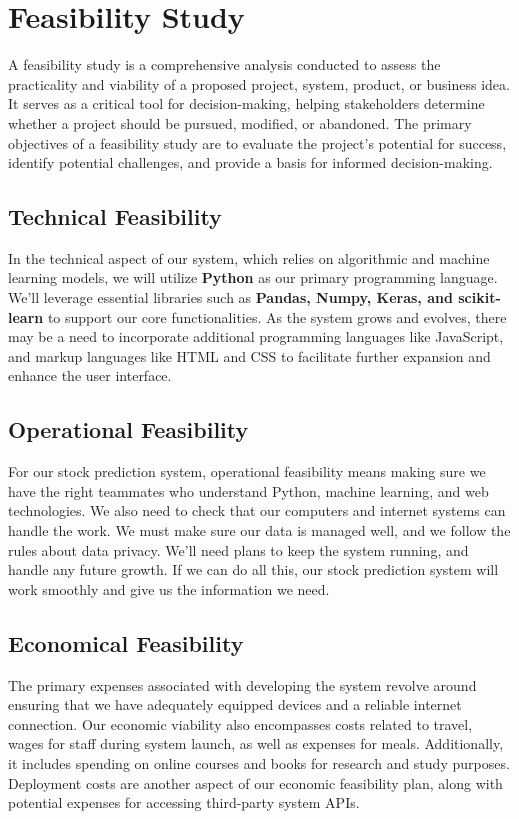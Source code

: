 \documentclass[./main.tex]{subfiles}
\begin{document}
\section{Feasibility Study} 
 A feasibility study is a comprehensive analysis conducted to assess the practicality and viability of a proposed project, system, product, or business idea. It serves as a critical tool for decision-making, helping stakeholders determine whether a project should be pursued, modified, or abandoned. The primary objectives of a feasibility study are to evaluate the project's potential for success, identify potential challenges, and provide a basis for informed decision-making. 
 
\subsection{Technical Feasibility}
 In the technical aspect of our system, which relies on algorithmic and machine learning models, we will utilize \textbf{Python} as our primary programming language. We'll leverage essential libraries such as \textbf{Pandas, Numpy, Keras, and scikit-learn} to support our core functionalities. As the system grows and evolves, there may be a need to incorporate additional programming languages like JavaScript, and markup languages like HTML and CSS to facilitate further expansion and enhance the user interface.

\subsection{Operational Feasibility}
 For our stock prediction system, operational feasibility means making sure we have the right teammates who understand Python, machine learning, and web technologies. We also need to check that our computers and internet systems can handle the work. We must make sure our data is managed well, and we follow the rules about data privacy. We'll need plans to keep the system running, and handle any future growth. If we can do all this, our stock prediction system will work smoothly and give us the information we need.

\subsection{Economical Feasibility}
The primary expenses associated with developing the system revolve around ensuring that we have adequately equipped devices and a reliable internet connection. Our economic viability also encompasses costs related to travel, wages for staff during system launch, as well as expenses for meals. Additionally, it includes spending on online courses and books for research and study purposes. Deployment costs are another aspect of our economic feasibility plan, along with potential expenses for accessing third-party system APIs.
\end{document}
